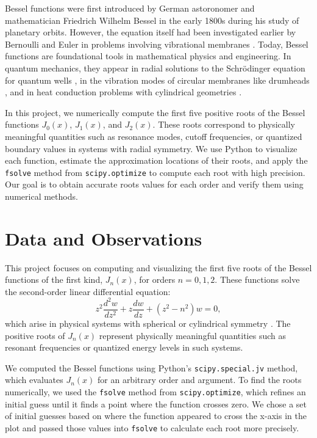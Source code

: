 \documentclass[linenumbers, twocolumn]{aastex631}
\begin{document}
\noindent Bessel functions were first introduced by German astoronomer and
mathematician Friedrich Wilhelm Bessel in the early 1800s during his study of
planetary orbits. However, the equation itself had been investigated earlier
by Bernoulli and Euler in problems involving vibrational membranes
\citet{abramowitz_stegun}. Today, Bessel functions are foundational tools in 
mathematical physics and engineering. In quantum mechanics, they appear in 
radial solutions to the Schrödinger equation for quantum wells \cite{hanson}, in the 
vibration modes of circular membranes like drumheads \cite{tamrin}, and in heat 
conduction problems with cylindrical geometries \cite{neils}.

\noindent In this project, we numerically compute the first five positive roots
of the Bessel functions $J_0(x)$, $J_1(x)$, and $J_2(x)$. These roots correspond
to physically meaningful quantities such as resonance modes, cutoff frequencies, 
or quantized boundary values in systems with radial symmetry. We use Python to visualize each
function, estimate the approximation locations of their roots, and apply the \texttt{fsolve}
method from \texttt{scipy.optimize} to compute each root with high precision. 
Our goal is to obtain accurate roots values for each order and verify them 
using numerical methods.\\


\section{Data and Observations} \label{sec:data}

This project focuses on computing and visualizing the first five roots of the
Bessel functions of the first kind, $J_n(x)$, for orders $n=0,1,2$. These
functions solve the second-order linear differential equation:
\begin{equation}
    z^2\frac{d^2 w}{dz^2}+z\frac{dw}{dz}+(z^2-n^2)w=0,
\end{equation}
\noindent which arise in physical systems with spherical or cylindrical 
symmetry \citet{abramowitz_stegun}. The positive roots of $J_n(x)$ represent physically meaningful
quantities such as resonant frequencies or quantized energy levels in such
systems.

\noindent We computed the Bessel functions using Python's \texttt{scipy.special.jv}
method, which evaluates $J_n(x)$ for an arbitrary order and argument. To
find the roots numerically, we used the \texttt{fsolve} method from \texttt{scipy.optimize},
which refines an initial guess until it finds a point where the function crosses
zero. We chose a set of initial guesses based on where the function appeared to
cross the x-axis in the plot and passed those values into \texttt{fsolve} to
calculate each root more precisely. 
\end{document}

